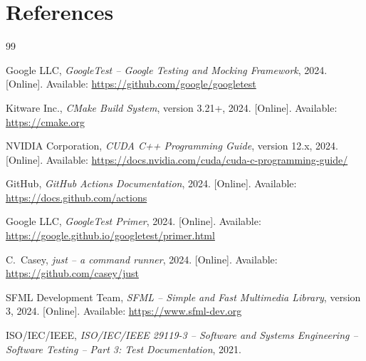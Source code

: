 
\clearpage
{}
\section*{References}
\renewcommand{\refname}{}
\singlespacing
\begin{thebibliography}{99}
	\vspace{-\topsep}

	Google LLC,
	\textit{GoogleTest -- Google Testing and Mocking Framework}, 2024.
		[Online]. Available: \url{https://github.com/google/googletest}

	Kitware Inc.,
	\textit{CMake Build System}, version 3.21+, 2024.
		[Online]. Available: \url{https://cmake.org}

	NVIDIA Corporation,
	\textit{CUDA C++ Programming Guide}, version 12.x, 2024.
		[Online]. Available: \url{https://docs.nvidia.com/cuda/cuda-c-programming-guide/}

	GitHub,
	\textit{GitHub Actions Documentation}, 2024.
		[Online]. Available: \url{https://docs.github.com/actions}

	Google LLC,
	\textit{GoogleTest Primer}, 2024.
		[Online]. Available: \url{https://google.github.io/googletest/primer.html}

	C.~Casey,
	\textit{just -- a command runner}, 2024.
		[Online]. Available: \url{https://github.com/casey/just}

	SFML Development Team,
	\textit{SFML -- Simple and Fast Multimedia Library}, version 3, 2024.
		[Online]. Available: \url{https://www.sfml-dev.org}

	ISO/IEC/IEEE,
	\textit{ISO/IEC/IEEE 29119-3 -- Software and Systems Engineering -- Software Testing -- Part 3: Test Documentation}, 2021.

\end{thebibliography}
